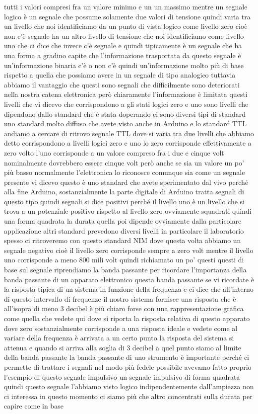 tutti i valori compresi fra un valore minimo e un un massimo mentre un segnale logico è un segnale che possume solamente due valori di tensione quindi varia tra un livello che noi identificiamo da un punto di vista logico come livello zero cioè non c'è segnale ha un altro livello di tensione che noi identificiamo come livello uno che ci dice che invece c'è segnale e quindi tipicamente è un segnale che ha una forma a gradino capite che l'informazione trasportata da questo segnale è un'informazione binaria c'è o non c'è quindi un'informazione molto più di base rispetto a quella che possiamo avere in un segnale di tipo analogico tuttavia abbiamo il vantaggio che questi sono segnali che difficilmente sono deteriorati nella nostra catena elettronica però chiaramente l'informazione è limitata questi livelli che vi dicevo che corrispondono a gli stati logici zero e uno sono livelli che dipendono dallo standard che è stata doperando ci sono diversi tipi di standard uno standard molto diffuso che avete visto anche in Arduino e lo standard TTL andiamo a cercare di ritrovo segnale TTL dove si varia tra due livelli che abbiamo detto corrispondono a livelli logici zero e uno lo zero corrisponde effettivamente a zero volto l'uno corrisponde a un valore compreso fra i due e cinque volt nominalmente dovrebbero essere cinque volt però anche se sia un valore un po' più basso normalmente l'elettronica lo riconosce comunque sia come un segnale presente vi dicevo questo è uno standard che avete sperimentato dal vivo perché alla fine Arduino, sostanzialmente la parte digitale di Arduino tratta segnali di questo tipo quindi segnali si dice positivi perché il livello uno è un livello che si trova a un potenziale positivo rispetto al livello zero ovviamente squadrati quindi una forma quadrata la durata quella poi dipende ovviamente dalla particolare applicazione altri standard prevedono diversi livelli in particolare il laboratorio spesso ci ritroveremo con questo standard NIM dove questa volta abbiamo un segnale negativo cioè il livello zero corrisponde sempre a zero volt mentre il livello uno corrisponde a meno 800 mili volt quindi richiamato un po' questi questi di base sul segnale riprendiamo la banda passante per ricordare l'importanza della banda passante di un apparato elettronico questa banda passante se vi ricordate è la risposta tipica di un sistema in funzione della frequenza e ci dice che all'interno di questo intervallo di frequenze il nostro sistema fornisce una risposta che è all'isopra di meno 3 decibel è più chiaro forse con una rappresentazione grafica come quella che vedete qui dove si riporta la risposta relativa di questo apparato dove zero sostanzialmente corrisponde a una risposta ideale e vedete come al variare della frequenza è arrivata a un certo punto la risposta del sistema si attenua e quando si arriva alla soglia di 3 decibel a quel punto siamo al limite della banda passante la banda passante di uno strumento è importante perché ci permette di trattare i segnali nel modo più fedele possibile avevamo fatto proprio l'esempio di questo segnale impulsivo un segnale impulsivo di forma quadrata quindi questo segnale l'abbiamo visto logico indipendentemente dall'ampiezza non ci interessa in questo momento ci siamo più che altro concentrati sulla durata per capire come in base 